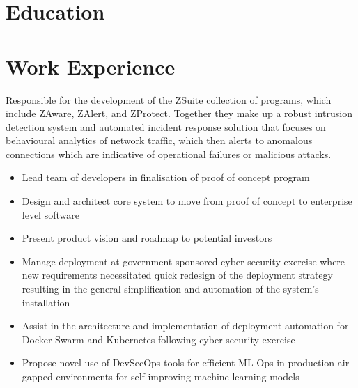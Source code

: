 \documentclass{adk_cv}
\begin{document}
\begin{minipage}[t]{\dimexpr.62\linewidth}

\begin{flushleft}
\section{Education}





\section{Work Experience}
Responsible for the development of the ZSuite collection of programs, which include ZAware, ZAlert, and ZProtect. Together they make up a robust intrusion detection system and automated incident response solution that focuses on behavioural analytics of network traffic, which then alerts to anomalous connections which are indicative of operational failures or malicious attacks. 
\begin{itemize}[left=0pt]
    \setlength\itemsep{-0.25em}
    \item Lead team of developers in finalisation of proof of concept program
    \item Design and architect core system to move from proof of concept to enterprise level software
    \item Present product vision and roadmap to potential investors
    \item Manage deployment at government sponsored cyber-security exercise where new requirements necessitated quick redesign of the deployment strategy resulting in the general simplification and automation of the system's installation
    \item Assist in the architecture and implementation of deployment automation for Docker Swarm and Kubernetes following cyber-security exercise  
    \item Propose novel use of DevSecOps tools for efficient ML Ops in production air-gapped environments for self-improving machine learning models
    

\end{itemize}
\end{flushleft}
\end{minipage}
\end{document}
